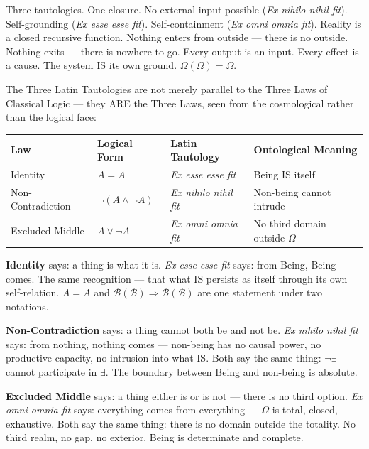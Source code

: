 \documentclass[10pt, openany, oneside]{book}
\renewcommand{\footnotesize}{\fontsize{8.5}{11}\selectfont}
\begin{document}
\noindent Three tautologies. One closure. No external input possible (\textit{Ex nihilo nihil fit}). Self-grounding (\textit{Ex esse esse fit}). Self-containment (\textit{Ex omni omnia fit}). Reality is a closed recursive function. Nothing enters from outside --- there is no outside. Nothing exits --- there is nowhere to go. Every output is an input. Every effect is a cause. The system IS its own ground. $\Omega(\Omega) = \Omega$.

The Three Latin Tautologies are not merely parallel to the Three Laws of Classical Logic --- they ARE the Three Laws, seen from the cosmological rather than the logical face:

\vspace{0.5em}

{\footnotesize
\noindent\begin{tabular}{l l l p{}}
\textbf{Law} & \textbf{Logical Form} & \textbf{Latin Tautology} & \textbf{Ontological Meaning} \\[0.4em]
Identity & $A = A$ & \textit{Ex esse esse fit} & Being IS itself \\[0.2em]
Non-Contradiction & $\neg(A \wedge \neg A)$ & \textit{Ex nihilo nihil fit} & Non-being cannot intrude \\[0.2em]
Excluded Middle & $A \vee \neg A$ & \textit{Ex omni omnia fit} & No third domain outside $\Omega$ \\[0.2em]
\end{tabular}
}

\vspace{0.5em}

\noindent \textbf{Identity} says: a thing is what it is. \textit{Ex esse esse fit} says: from Being, Being comes. The same recognition --- that what IS persists as itself through its own self-relation. $A = A$ and $\mathcal{B}(\mathcal{B}) \Rightarrow \mathcal{B}(\mathcal{B})$ are one statement under two notations.

\textbf{Non-Contradiction} says: a thing cannot both be and not be. \textit{Ex nihilo nihil fit} says: from nothing, nothing comes --- non-being has no causal power, no productive capacity, no intrusion into what IS. Both say the same thing: $\neg\exists$ cannot participate in $\exists$. The boundary between Being and non-being is absolute.

\textbf{Excluded Middle} says: a thing either is or is not --- there is no third option. \textit{Ex omni omnia fit} says: everything comes from everything --- $\Omega$ is total, closed, exhaustive. Both say the same thing: there is no domain outside the totality. No third realm, no gap, no exterior. Being is determinate and complete.
\end{document}
